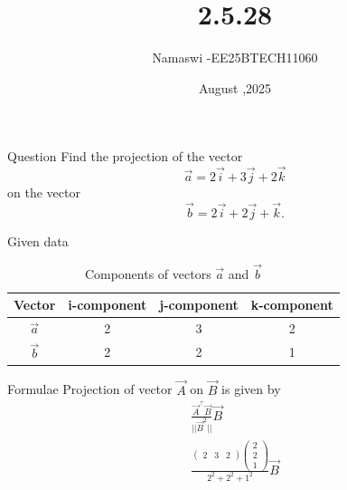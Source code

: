 \documentclass{beamer}
\begin{document}
\title 
{2.5.28}
\date{August ,2025}


\author 
{Namaswi -EE25BTECH11060}






\frame{\titlepage}
\begin{frame}{Question}
 Find the projection of the vector 
\[
\vec{a} = 2\vec{i} + 3\vec{j} + 2\vec{k}
\]
on the vector 
\[
\vec{b} = 2\vec{i} + 2\vec{j} + \vec{k}.
\]
\end{frame}



\begin{frame}{Given data}
\begin{table}[h!]
\centering
\begin{tabular}{|c|c|c|c|}
\hline
\textbf{Vector} & \textbf{i-component} & \textbf{j-component} & \textbf{k-component} \\
\hline
$\vec{a}$ & 2 & 3 & 2 \\
\hline
$\vec{b}$ & 2 & 2 & 1 \\
\hline
\end{tabular}
\caption{Components of vectors $\vec{a}$ and $\vec{b}$}
\end{table}

 
\end{frame}

\begin{frame}{Formulae}
 Projection of vector $\vec{A}$  on $\vec{B}$ is given by \\
\begin{align}
\frac{\vec{A}^\top\vec{B}}{||\vec{B}^2||}\vec{B}\\
\frac{\begin{pmatrix} 2 & 3 & 2 \end{pmatrix}\begin{pmatrix}
    2 \\ 2 \\ 1 \end{pmatrix}}{2^2+2^2+1^2}\vec{B}\\
\end{align}
\end{frame}
\end{document}
